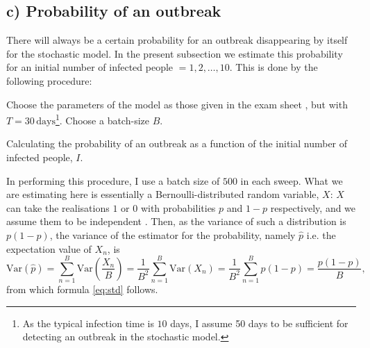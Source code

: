 \subsection{c) Probability of an outbreak}

There will always be a certain probability for an outbreak disappearing by itself for the stochastic model. In the present subsection we estimate this probability for an initial number of infected people $=1,2,\dots,10$. This is done by the following procedure:

\begin{algorithm}[H]
	Choose the parameters of the model as those given in the exam sheet \cite{sheet}, but with $T = 30 \, \mathrm{days}$\footnote{As the typical infection time is $10$ days, I assume 50 days to be sufficient for detecting an outbreak in the stochastic model.}. \;
	Choose a batch-size $B$.\;
	\caption{Calculating the probability of an outbreak as a function of the initial number of infected people, $I$. }
\end{algorithm} 

In performing this procedure, I use a batch size of $500$ in each sweep. What we are estimating here is essentially a Bernoulli-distributed random variable, $X$: $X$ can take the realisations $1$ or $0$ with probabilities $p$ and $1-p$ respectively, and we assume them to be independent \cite[~p.26]{Wassermann}. Then, as the variance of such a distribution is $p(1-p)$, the variance of the estimator for the probability, namely $\hat{p}$ i.e. the expectation value of $X_n$, is 
$$
	\mathrm{Var}(\hat{p}) =  \sum_{n= 1}^{B} \mathrm{Var}\left(\frac{X_n}{B}\right) = \frac{1}{B^2} \sum_{n= 1}^{B} \mathrm{Var}(X_n) = \frac{1}{B^2} \sum_{n= 1}^{B} p (1-p) = \frac{p(1-p)}{B},
$$
from which formula \eqref{eq:std} follows. 

